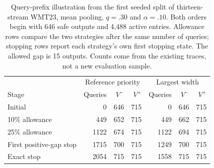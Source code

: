 \begin{table}[t]
\centering\small
\begin{tabular}{lrrrrrr}
\toprule
& \multicolumn{3}{c}{Reference priority} & \multicolumn{3}{c}{Largest width} \\
Stage & Queries & $V^-$ & $V^+$ & Queries & $V^-$ & $V^+$ \\
\midrule
Initial & 0 & 646 & 715 & 0 & 646 & 715 \\
10\% allowance & 449 & 652 & 715 & 449 & 662 & 715 \\
25\% allowance & 1122 & 674 & 715 & 1122 & 694 & 715 \\
First positive-gap stop & 1715 & 700 & 715 & 1249 & 700 & 715 \\
Exact stop & 2054 & 715 & 715 & 1558 & 715 & 715 \\
\bottomrule
\end{tabular}
\caption{Query-prefix illustration from the first seeded split of thirteen-stream WMT23, mean pooling, $q=.30$ and $\alpha=.10$. Both orders begin with 646 safe outputs and 4,488 active entries. Allowance rows compare the two strategies after the same number of queries; stopping rows report each strategy's own first stopping state. The allowed gap is 15 outputs. Counts come from the existing traces, not a new evaluation sample.}
\label{tab:query-prefix-example}
\end{table}
